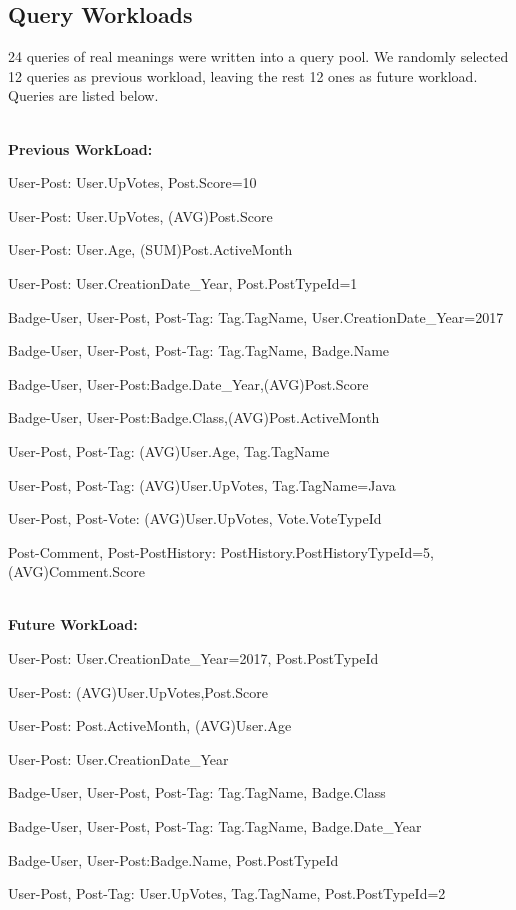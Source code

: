 \subsection{Query Workloads}
24 queries of real meanings were written into a query pool. We randomly selected 12 queries as previous workload, leaving the rest 12 ones as future workload. Queries are listed below.


\\\textbf{Previous WorkLoad:}

User-Post: User.UpVotes, Post.Score=10

User-Post: User.UpVotes, (AVG)Post.Score

User-Post: User.Age, (SUM)Post.ActiveMonth

User-Post: User.CreationDate_Year, Post.PostTypeId=1

Badge-User, User-Post, Post-Tag: Tag.TagName, User.CreationDate_Year=2017

Badge-User, User-Post, Post-Tag: Tag.TagName, Badge.Name

Badge-User, User-Post:Badge.Date_Year,(AVG)Post.Score

Badge-User, User-Post:Badge.Class,(AVG)Post.ActiveMonth

User-Post, Post-Tag: (AVG)User.Age, Tag.TagName

User-Post, Post-Tag: (AVG)User.UpVotes, Tag.TagName=Java

User-Post, Post-Vote: (AVG)User.UpVotes, Vote.VoteTypeId

Post-Comment, Post-PostHistory: PostHistory.PostHistoryTypeId=5, (AVG)Comment.Score


\\\textbf{Future WorkLoad:}

User-Post: User.CreationDate_Year=2017, Post.PostTypeId

User-Post: (AVG)User.UpVotes,Post.Score

User-Post: Post.ActiveMonth, (AVG)User.Age

User-Post: User.CreationDate_Year

Badge-User, User-Post, Post-Tag: Tag.TagName, Badge.Class

Badge-User, User-Post, Post-Tag: Tag.TagName, Badge.Date_Year

Badge-User, User-Post:Badge.Name, Post.PostTypeId

User-Post, Post-Tag: User.UpVotes, Tag.TagName, Post.PostTypeId=2

